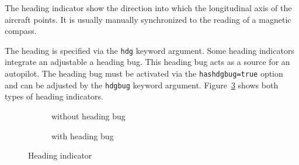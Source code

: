 The heading indicator show the direction into which the longitudinal axis of
the aircraft points. It is usually manually synchronized to the reading of a
magnetic compass.

The heading is specified via the \texttt{hdg} keyword argument. Some heading
indicators integrate an adjustable a heading bug. This heading bug acts as a
source for an autopilot. The heading bug must be activated via the
\texttt{hashdgbug=true} option and can be adjusted by the \texttt{hdgbug}
keyword argument. Figure~\ref{fig:inst:hi:base} shows both types of heading
indicators.

\begin{figure}[!h]
\begin{subfigure}{\linewidth}
\centering
{}
\caption{without heading bug}
\label{fig:inst:hi:base_nobug}
\end{subfigure}

\medskip

\begin{subfigure}{\linewidth}
\centering
{}
\caption{with heading bug}
\label{fig:inst:hi:base_bug}
\end{subfigure}

\caption{Heading indicator}
\label{fig:inst:hi:base}
\end{figure}
